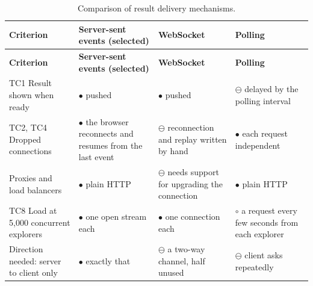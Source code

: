 {\small{}\renewcommand{\arraystretch}{1.1}
\begin{longtable}{|>{\raggedright\arraybackslash}p{}|>{\raggedright\arraybackslash}p{}|>{\raggedright\arraybackslash}p{}|>{\raggedright\arraybackslash}p{}|}
\caption{Comparison of result delivery mechanisms.} \\
\hline
\textbf{Criterion} & \textbf{Server-sent events (selected)} & \textbf{WebSocket\cite{r176}} & \textbf{Polling} \\ \hline
\endfirsthead
\hline
\textbf{Criterion} & \textbf{Server-sent events (selected)} & \textbf{WebSocket\cite{r176}} & \textbf{Polling} \\ \hline
\endhead
TC1 Result shown when ready & $\bullet$ pushed & $\bullet$ pushed & $\ominus$ delayed by the polling interval \\ \hline
TC2, TC4 Dropped connections & $\bullet$ the browser reconnects and resumes from the last event\cite{r144} & $\ominus$ reconnection and replay written by hand & $\bullet$ each request independent \\ \hline
Proxies and load balancers & $\bullet$ plain HTTP & $\ominus$ needs support for upgrading the connection & $\bullet$ plain HTTP \\ \hline
TC8 Load at 5,000 concurrent explorers & $\bullet$ one open stream each & $\bullet$ one connection each & $\circ$ a request every few seconds from each explorer \\ \hline
Direction needed: server to client only & $\bullet$ exactly that & $\ominus$ a two-way channel, half unused & $\ominus$ client asks repeatedly \\ \hline
\end{longtable}
}

